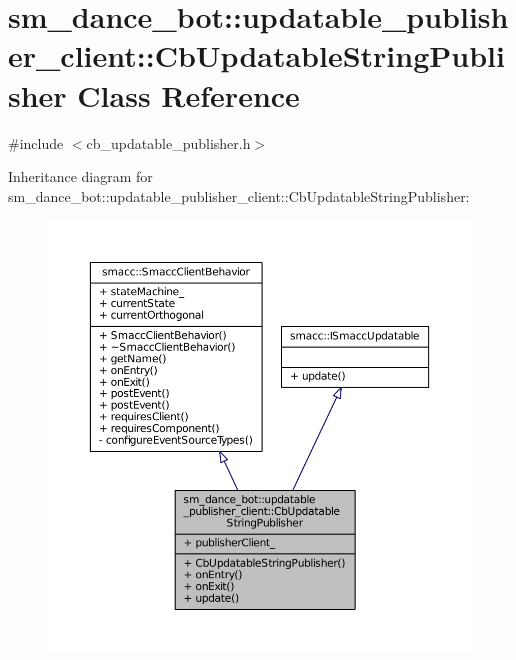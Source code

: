 \hypertarget{classsm__dance__bot_1_1updatable__publisher__client_1_1CbUpdatableStringPublisher}{}\section{sm\+\_\+dance\+\_\+bot\+:\+:updatable\+\_\+publisher\+\_\+client\+:\+:Cb\+Updatable\+String\+Publisher Class Reference}
\label{classsm__dance__bot_1_1updatable__publisher__client_1_1CbUpdatableStringPublisher}


{\ttfamily \#include $<$cb\+\_\+updatable\+\_\+publisher.\+h$>$}



Inheritance diagram for sm\+\_\+dance\+\_\+bot\+:\+:updatable\+\_\+publisher\+\_\+client\+:\+:Cb\+Updatable\+String\+Publisher\+:
\nopagebreak
\begin{figure}[H]
\begin{center}
\leavevmode
\includegraphics[width=350pt]{classsm__dance__bot_1_1updatable__publisher__client_1_1CbUpdatableStringPublisher__inherit__graph}
\end{center}
\end{figure}


